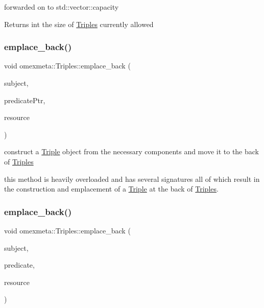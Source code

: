 forwarded on to std\+::vector\+::capacity 

\begin{DoxyReturn}{Returns}
int the size of \hyperlink{classomexmeta_1_1Triples}{Triples} currently allowed 
\end{DoxyReturn}
\mbox{\label{classomexmeta_1_1Triples_a9882f6f582e8d2e34e09d2f7076a0e2e}} 
\subsubsection{\texorpdfstring{emplace\+\_\+back()}{emplace\_back()}\hspace{0.1cm}{\footnotesize\ttfamily [1/7]}}
{\footnotesize\ttfamily void omexmeta\+::\+Triples\+::emplace\+\_\+back (\begin{DoxyParamCaption}\item[{\hyperlink{classomexmeta_1_1Subject}{Subject}}]{subject,  }\item[{const Predicate\+Ptr \&}]{predicate\+Ptr,  }\item[{const \hyperlink{classomexmeta_1_1Resource}{Resource} \&}]{resource }\end{DoxyParamCaption})}



construct a \hyperlink{classomexmeta_1_1Triple}{Triple} object from the necessary components and move it to the back of \hyperlink{classomexmeta_1_1Triples}{Triples} 

this method is heavily overloaded and has several signatures all of which result in the construction and emplacement of a \hyperlink{classomexmeta_1_1Triple}{Triple} at the back of \hyperlink{classomexmeta_1_1Triples}{Triples}. \mbox{\label{classomexmeta_1_1Triples_acab4513889a9a42c77b3044aac941728}} 
\subsubsection{\texorpdfstring{emplace\+\_\+back()}{emplace\_back()}\hspace{0.1cm}{\footnotesize\ttfamily [2/7]}}
{\footnotesize\ttfamily void omexmeta\+::\+Triples\+::emplace\+\_\+back (\begin{DoxyParamCaption}\item[{\hyperlink{classomexmeta_1_1Subject}{Subject}}]{subject,  }\item[{const \hyperlink{classomexmeta_1_1Predicate}{Predicate} \&}]{predicate,  }\item[{const \hyperlink{classomexmeta_1_1Resource}{Resource} \&}]{resource }\end{DoxyParamCaption})}



